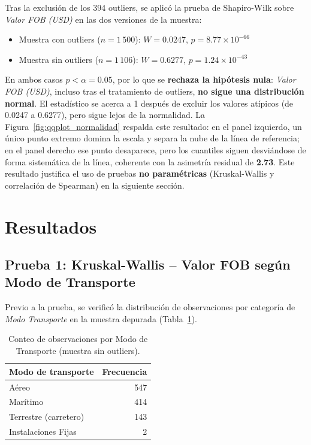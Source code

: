 \documentclass[12pt]{article}
\begin{document}
Tras la exclusión de los 394 outliers, se aplicó la prueba de
Shapiro-Wilk sobre \emph{Valor FOB (USD)} en las dos versiones de la
muestra:

\begin{itemize}
    \item Muestra con outliers (\(n = 1\,500\)): \(W = 0.0247\),
    \(p = 8.77 \times 10^{-66}\)
    \item Muestra sin outliers (\(n = 1\,106\)): \(W = 0.6277\),
    \(p = 1.24 \times 10^{-43}\)
\end{itemize}

En ambos casos \(p < \alpha = 0.05\), por lo que se \textbf{rechaza la
hipótesis nula}:
\emph{Valor FOB (USD)}, incluso tras el tratamiento de outliers,
\textbf{no sigue una distribución normal}. El estadístico se acerca a 1
después de excluir los valores atípicos (de 0.0247 a 0.6277), pero sigue
lejos de la normalidad. La
Figura~\ref{fig:qqplot_normalidad} respalda este resultado: en el panel
izquierdo, un único punto extremo domina la escala y separa la nube de
la línea de referencia; en el panel derecho ese punto desaparece, pero
los cuantiles siguen desviándose de forma sistemática de la línea,
coherente con la asimetría residual de \textbf{2.73}. Este resultado
justifica el uso de pruebas \textbf{no paramétricas} (Kruskal-Wallis y
correlación de Spearman) en la siguiente sección.

\section{Resultados}

\subsection{Prueba 1: Kruskal-Wallis -- Valor FOB según Modo de Transporte}

Previo a la prueba, se verificó la distribución de observaciones por
categoría de \emph{Modo Transporte} en la muestra depurada
(Tabla~\ref{tab:conteo_transporte}).

\begin{table}[htbp]
    \centering
    \caption{Conteo de observaciones por Modo de Transporte (muestra sin outliers).}
    \label{tab:conteo_transporte}
    \begin{tabular}{lr}
        \toprule
        Modo de transporte & Frecuencia \\
        \midrule
        Aéreo & 547 \\
        Marítimo & 414 \\
        Terrestre (carretero) & 143 \\
        Instalaciones Fijas & 2 \\
        \bottomrule
    \end{tabular}
\end{table}
\FloatBarrier
\end{document}
